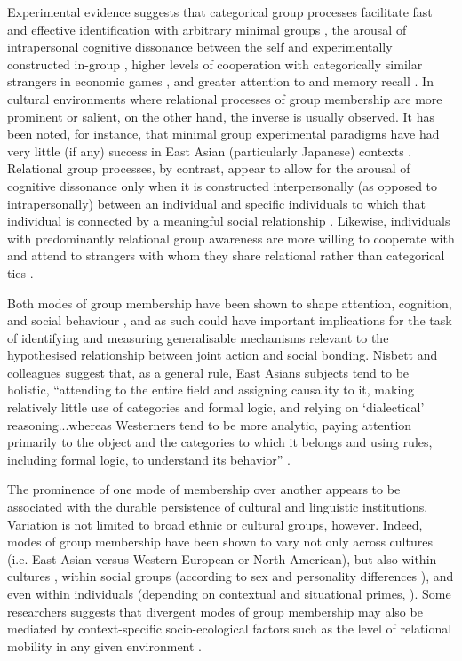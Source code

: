 \begin{CJK}{UTF8}{gbsn}
Experimental evidence suggests that categorical group processes facilitate fast and effective identification with arbitrary minimal groups \citep{Diehl1990,VanBavel2014}, the arousal of intrapersonal cognitive dissonance between the self and experimentally constructed in-group \citep{Festinger1957, Stone2001}, higher levels of cooperation with categorically similar strangers in economic games \citep{Yuki2005,Yuki2003}, and greater attention to and memory recall \citep{Buchan2006,Ng2016}.  In cultural environments where relational processes of group membership are more prominent or salient, on the other hand, the inverse is usually observed. It has been noted, for instance, that minimal group experimental paradigms have had very little (if any) success in East Asian (particularly Japanese) contexts \citep[586]{Liu2009}.  Relational group processes, by contrast, appear to allow for the arousal of cognitive dissonance only when it is constructed interpersonally (as opposed to intrapersonally) between an individual and specific individuals to which that individual is connected by a meaningful social relationship \citep{Hoshino-Browne2005}.  Likewise, individuals with predominantly relational group awareness are more willing to cooperate with and attend to strangers with whom they share relational rather than categorical ties \citep{Ng2016,Yuki2005}.

Both modes of group membership have been shown to shape attention, cognition, and social behaviour \citep{Nisbett2003}, and as such could have important implications for the task of identifying and measuring generalisable mechanisms relevant to the hypothesised relationship between joint action and social bonding.  Nisbett and colleagues suggest that, as a general rule, East Asians subjects tend to be holistic, ``attending to the entire field and assigning causality to it, making relatively little use of categories and formal logic, and relying on ‘dialectical’ reasoning...whereas Westerners tend to be more analytic, paying attention primarily to the object and the categories to which it belongs and using rules, including formal logic, to understand its behavior'' \citep[291]{Nisbett2001}.

The prominence of one mode of membership over another appears to be
associated with the durable persistence of cultural and linguistic institutions.  Variation is not limited to broad ethnic or cultural groups, however. Indeed, modes of group membership have been shown to vary not only across cultures (i.e. East Asian versus Western European or North American), but also within cultures \citep{Henrich2014}, within social groups (according to sex and personality differences \citep{Yuki2014}), and even within individuals (depending on contextual and situational primes, \citep{Lee2014,Wong2005}). Some researchers suggests that divergent modes of group membership may also be mediated by context-specific socio-ecological factors such as the level of relational mobility in any given environment \citep{Oishi2010,Takagishi2014,Yuki2005}.


\end{CJK}
